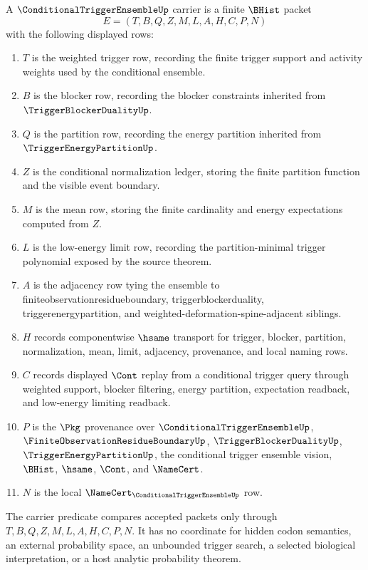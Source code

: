 \begin{definition}
\label{def:conditional-trigger-ensemble-carrier}
A $\ConditionalTriggerEnsembleUp$ carrier is a finite $\BHist$ packet
$$
E=(T,B,Q,Z,M,L,A,H,C,P,N)
$$
with the following displayed rows:
\begin{enumerate}
\item $T$ is the weighted trigger row, recording the finite trigger support and activity weights used by the conditional ensemble.
\item $B$ is the blocker row, recording the blocker constraints inherited from $\TriggerBlockerDualityUp$.
\item $Q$ is the partition row, recording the energy partition inherited from $\TriggerEnergyPartitionUp$.
\item $Z$ is the conditional normalization ledger, storing the finite partition function and the visible event boundary.
\item $M$ is the mean row, storing the finite cardinality and energy expectations computed from $Z$.
\item $L$ is the low-energy limit row, recording the partition-minimal trigger polynomial exposed by the source theorem.
\item $A$ is the adjacency row tying the ensemble to finiteobservationresidueboundary, triggerblockerduality, triggerenergypartition, and weighted-deformation-spine-adjacent siblings.
\item $H$ records componentwise $\hsame$ transport for trigger, blocker, partition, normalization, mean, limit, adjacency, provenance, and local naming rows.
\item $C$ records displayed $\Cont$ replay from a conditional trigger query through weighted support, blocker filtering, energy partition, expectation readback, and low-energy limiting readback.
\item $P$ is the $\Pkg$ provenance over $\ConditionalTriggerEnsembleUp$, $\FiniteObservationResidueBoundaryUp$, $\TriggerBlockerDualityUp$, $\TriggerEnergyPartitionUp$, the conditional trigger ensemble vision, $\BHist$, $\hsame$, $\Cont$, and $\NameCert$.
\item $N$ is the local $\NameCert_{\ConditionalTriggerEnsembleUp}$ row.
\end{enumerate}
The carrier predicate compares accepted packets only through $T,B,Q,Z,M,L,A,H,C,P,N$. It has no coordinate for hidden codon semantics, an external probability space, an unbounded trigger search, a selected biological interpretation, or a host analytic probability theorem.
\end{definition}

